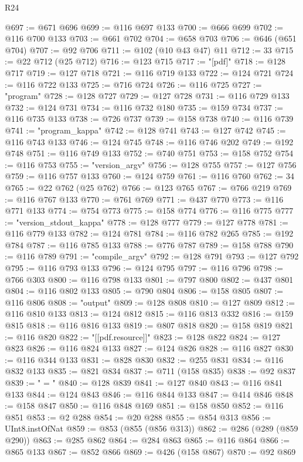 \begin{lexlean}{R24}
\begin{coremodule}
@697 := @671 @696
@699 := @116 @697 @133
@700 := @666 @699
@702 := @116 @700 @133
@703 := @661 @702
@704 := @658 @703
@706 := @646 (@651 @704)
@707 := @92 @706
@711 := @102 (@10 @43 @47) @11
@712 := 33
@715 := @22 @712 (@25 @712)
@716 := @123 @715
@717 := "[pdf]"
@718 := @128 @717
@719 := @127 @718
@721 := @116 @719 @133
@722 := @124 @721
@724 := @116 @722 @133
@725 := @716 @724
@726 := @116 @725
@727 := "program"
@728 := @128 @727
@729 := @127 @728
@731 := @116 @729 @133
@732 := @124 @731
@734 := @116 @732 @180
@735 := @159 @734
@737 := @116 @735 @133
@738 := @726 @737
@739 := @158 @738
@740 := @116 @739
@741 := "program_kappa"
@742 := @128 @741
@743 := @127 @742
@745 := @116 @743 @133
@746 := @124 @745
@748 := @116 @746 @202
@749 := @192 @748
@751 := @116 @749 @133
@752 := @740 @751
@753 := @158 @752
@754 := @116 @753
@755 := "version_argv"
@756 := @128 @755
@757 := @127 @756
@759 := @116 @757 @133
@760 := @124 @759
@761 := @116 @760
@762 := 34
@765 := @22 @762 (@25 @762)
@766 := @123 @765
@767 := @766 @219
@769 := @116 @767 @133
@770 := @761 @769
@771 := @437 @770
@773 := @116 @771 @133
@774 := @754 @773
@775 := @158 @774
@776 := @116 @775
@777 := "version_stdout_kappa"
@778 := @128 @777
@779 := @127 @778
@781 := @116 @779 @133
@782 := @124 @781
@784 := @116 @782 @265
@785 := @192 @784
@787 := @116 @785 @133
@788 := @776 @787
@789 := @158 @788
@790 := @116 @789
@791 := "compile_argv"
@792 := @128 @791
@793 := @127 @792
@795 := @116 @793 @133
@796 := @124 @795
@797 := @116 @796
@798 := @766 @303
@800 := @116 @798 @133
@801 := @797 @800
@802 := @437 @801
@804 := @116 @802 @133
@805 := @790 @804
@806 := @158 @805
@807 := @116 @806
@808 := "output"
@809 := @128 @808
@810 := @127 @809
@812 := @116 @810 @133
@813 := @124 @812
@815 := @116 @813 @332
@816 := @159 @815
@818 := @116 @816 @133
@819 := @807 @818
@820 := @158 @819
@821 := @116 @820
@822 := "[[pdf.resource]]"
@823 := @128 @822
@824 := @127 @823
@826 := @116 @824 @133
@827 := @124 @826
@828 := @116 @827
@830 := @116 @344 @133
@831 := @828 @830
@832 := @255 @831
@834 := @116 @832 @133
@835 := @821 @834
@837 := @711 (@158 @835)
@838 := @92 @837
@839 := " = "
@840 := @128 @839
@841 := @127 @840
@843 := @116 @841 @133
@844 := @124 @843
@846 := @116 @844 @133
@847 := @414 @846
@848 := @158 @847
@850 := @116 @848 @169
@851 := @158 @850
@852 := @116 @851
@853 := @2 @288
@854 := @20 @288
@855 := @854 @313
@856 := UInt8.instOfNat
@859 := @853 (@855 (@856 @313))
@862 := @286 (@289 (@859 @290))
@863 := @285 @862
@864 := @284 @863
@865 := @116 @864
@866 := @865 @133
@867 := @852 @866
@869 := @426 (@158 @867)
@870 := @92 @869

\end{coremodule}
\end{lexlean}
